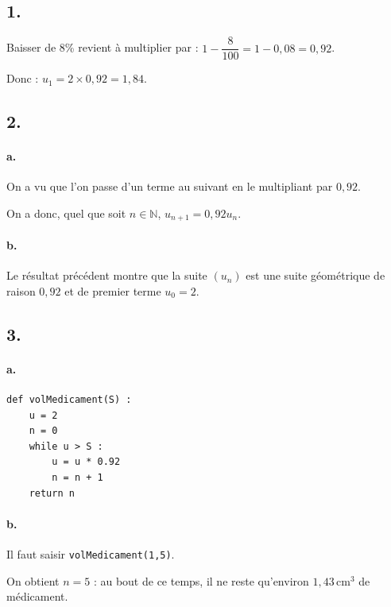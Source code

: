\subsection*{1.}

Baisser de 8\% revient à multiplier par :
\(1 - \dfrac{8}{100} = 1 - 0,08 = 0,92\).

Donc : \(u_1 = 2 \times 0,92 = 1,84\).

\subsection*{2.}

\paragraph{a.} On a vu que l'on passe d'un terme au suivant en le multipliant par \(0,92\).  

On a donc, quel que soit \(n \in \mathbb{N}\), \(u_{n+1} = 0,92 u_n\).

\paragraph{b.} Le résultat précédent montre que la suite \((u_n)\) est une suite géométrique de raison \(0,92\) et de premier terme \(u_0 = 2\).

\subsection*{3.}

\paragraph{a.}
\begin{center}
\begin{lstlisting}[style=python]
def volMedicament(S) :
	u = 2
	n = 0
	while u > S :
		u = u * 0.92
		n = n + 1
	return n
\end{lstlisting}
\end{center}

\paragraph{b.} Il faut saisir \texttt{volMedicament(1,5)}.

On obtient \(n = 5\) : au bout de ce temps, il ne reste qu'environ \(1,43 \, \text{cm}^3\) de médicament.
